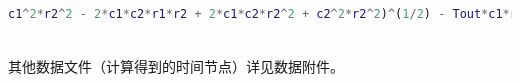 \documentclass[withoutpreface,bwprint]{cumcmthesis} %
\begin{document}
\begin{appendices}
\begin{lstlisting}[language=matlab]
c1^2*r2^2 - 2*c1*c2*r1*r2 + 2*c1*c2*r2^2 + c2^2*r2^2)^(1/2) - Tout*c1*r1 - Tout*c1*r2 + Tout*c2*r2 + 2*Pn*c1*c2*r2^2))/((c1*r1 + c1*r2 + c2*r2 - (c1^2*r1^2 + 2*c1^2*r1*r2 + c1^2*r2^2 - 2*c1*c2*r1*r2 + 2*c1*c2*r2^2 + c2^2*r2^2)^(1/2))*(c1^2*r1^2 + 2*c1^2*r1*r2 + c1^2*r2^2 - 2*c1*c2*r1*r2 + 2*c1*c2*r2^2 + c2^2*r2^2)^(1/2)))
 
 \end{lstlisting}
 其他数据文件（计算得到的时间节点）详见数据附件。
\end{appendices}
\end{document}
